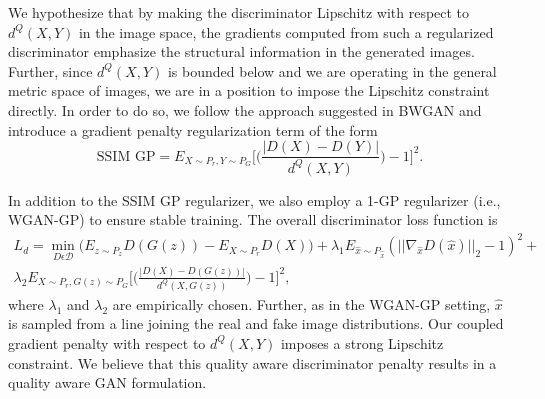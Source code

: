\documentclass{article}
\begin{document}
We hypothesize that by making the discriminator Lipschitz with respect to $d^Q(X, Y)$ in the image space, the gradients computed from such a regularized discriminator emphasize the structural information in the generated images. Further, since $d^Q(X, Y)$ is bounded below and we are operating in the general metric space of images, we are in a position to impose the Lipschitz constraint directly. In order to do so, we follow the approach suggested in BWGAN \cite{adler2018banach} and introduce a gradient penalty regularization term of the form
\begin{equation}
   \text{SSIM GP} = E_{X \sim P_{r},Y \sim P_{G}}\bigg[\bigg(\frac{|D(X)-D(Y)|}{d^Q(X,Y)} \bigg)- 1\bigg]^{2}.
\end{equation}


In addition to the SSIM GP regularizer, we also employ a 1-GP regularizer (i.e., WGAN-GP) to ensure stable training.
The overall discriminator loss function is
\begin{equation}
\begin{split}
L_{d} =\min_{D \epsilon \mathcal{D}} \bigg( E_{z \sim P_{z}}D(G(z)) - E_{X \sim P_{r}}D(X) \bigg) + \lambda_{1}E_{\hat{x}\sim P_{\hat{x}}}(||\nabla_{\hat{x}} D(\hat{x})||_{2}-1)^{2} +  
\\
\lambda_{2}E_{X \sim P_{r}, G(z) \sim P_{G}}\bigg[\bigg(\frac{|D(X)-D(G(z))|}{d^Q(X,G(z))}\bigg)- 1\bigg]^{2},
\end{split}
\end{equation}
where $\lambda_{1}$ and $\lambda_{2}$ are empirically chosen. Further, as in the WGAN-GP setting, $\hat{x}$ is sampled from a line joining the real and fake image distributions.
Our coupled gradient penalty with respect to $d^Q(X, Y)$ imposes a strong Lipschitz constraint. We believe that this quality aware discriminator penalty results in a quality aware GAN formulation.
\end{document}

